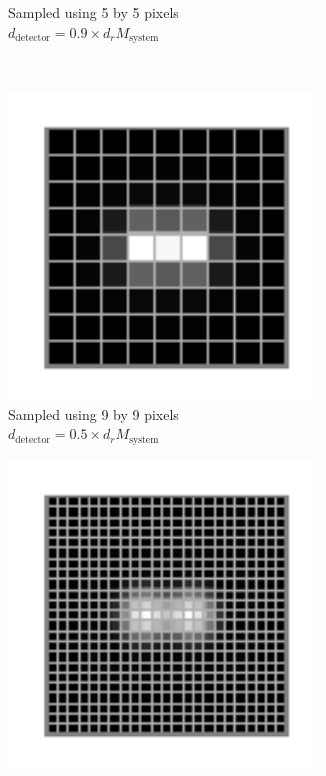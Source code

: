 \begin{figure}
\begin{subfigure}[t]{0.4\textwidth}
        \caption{Sampled using 5 by 5 pixels\\
        \(d_{\text{detector}} = 0.9 \times  d_{r}M_{\text{system}}\)}\label{fig:digital_airy_sample_5}
    \end{subfigure}\\
    \begin{subfigure}[t]{0.4\textwidth}
        \centering
        \includegraphics[width=0.9\textwidth]{./sampling/digital_airy_sample_9}
        \caption{Sampled using 9 by 9 pixels\\
        \(d_{\text{detector}} = 0.5 \times d_{r}M_{\text{system}}\)}\label{fig:digital_airy_sample_9}
    \end{subfigure}\quad
    \begin{subfigure}[t]{0.4\textwidth}
        \centering
        \includegraphics[width=0.9\textwidth]{./sampling/digital_airy_sample_23}

\end{subfigure}
\end{figure}
